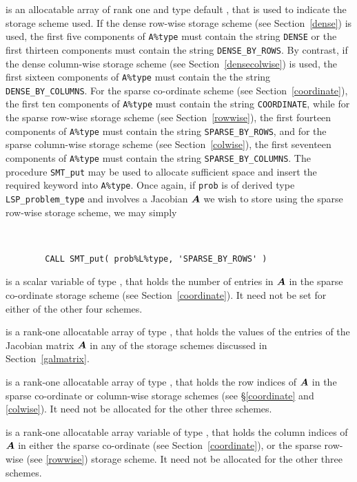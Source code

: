 \documentclass{galahad}
\newcommand{\packagename}{LSP}
\begin{document}
\begin{description}
\begin{description}
 is an allocatable array of rank one and type default \character, 
that is used to indicate the storage scheme used. If the dense row-wise 
storage scheme (see Section~\ref{dense}) is used, 
the first five components of {\tt A\%type} must contain the
string {\tt DENSE} or the first thirteen components must contain the
string {\tt DENSE\_BY\_ROWS}.
By contrast, if the dense column-wise storage scheme 
(see Section~\ref{densecolwise}) is used, 
the first sixteen components of {\tt A\%type} must contain the
the string {\tt DENSE\_BY\_COLUMNS}.
For the sparse co-ordinate scheme (see Section~\ref{coordinate}), 
the first ten components of {\tt A\%type} must contain the
string {\tt COORDINATE}, while 
for the sparse row-wise storage scheme (see Section~\ref{rowwise}),
the first fourteen components of {\tt A\%type} must contain the
string {\tt SPARSE\_BY\_ROWS},
and for the sparse column-wise storage scheme (see Section~\ref{colwise}),
the first seventeen components of {\tt A\%type} must contain the
string {\tt SPARSE\_BY\_COLUMNS}.
The procedure {\tt SMT\_put} may be used to allocate sufficient space and 
insert the required keyword into {\tt A\%type}.
Once again, if {\tt prob} is of derived type {\tt \packagename\_problem\_type}
and involves a Jacobian ${\bm{A}}$ we wish to store using the sparse row-wise 
storage scheme, we may simply
{\tt 
\begin{verbatim}
        CALL SMT_put( prob%L%type, 'SPARSE_BY_ROWS' )
\end{verbatim}
}
\noindent

 is a scalar variable of type \integer, that 
holds the number of entries in ${\bm{A}}$
in the sparse co-ordinate storage scheme (see Section~\ref{coordinate}). 
It need not be set for either of the other four schemes.

 is a rank-one allocatable array of type \realdp, that holds
the values of the entries of the Jacobian matrix ${\bm{A}}$ in any of the 
storage schemes discussed in Section~\ref{galmatrix}.

 is a rank-one allocatable array of type \integer,
that holds the row indices of ${\bm{A}}$ in the sparse co-ordinate 
or column-wise storage schemes (see \S\ref{coordinate} and \ref{colwise}).
It need not be allocated for the other three schemes.

 is a rank-one allocatable array variable of type \integer,
that holds the column indices of ${\bm{A}}$ in either the sparse co-ordinate 
(see Section~\ref{coordinate}), or the sparse row-wise 
(see \ref{rowwise}) storage scheme.
It need not be allocated for the other three schemes.


\end{description}
\end{description}
\end{document}

